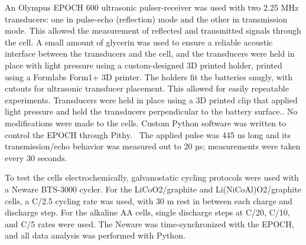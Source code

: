 An Olympus EPOCH 600 ultrasonic pulser-receiver was used with two 2.25 MHz transducers: one in pulse-echo (reflection) mode and the other in transmission mode. This allowed the measurement of reflected and transmitted signals through the cell. A small amount of glycerin was used to ensure a reliable acoustic interface between the transducers and the cell, and the transducers were held in place with light pressure using a custom-designed 3D printed holder, printed using a Formlabs Form1+ 3D printer. The holders fit the batteries snugly, with cutouts for ultrasonic transducer placement. This allowed for easily repeatable experiments. Transducers were held in place using a 3D printed clip that applied light pressure and held the transducers perpendicular to the battery surface.. No modifications were made to the cells. Custom Python software was written to control the EPOCH through Pithy.~\cite{Steingart_undated-rr} The applied pulse was 445 ns long and its transmission/echo behavior was measured out to 20 µs; measurements were taken every 30 seconds.
	
To test the cells electrochemically, galvanostatic cycling protocols were used with a Neware BTS-3000 cycler. For the LiCoO2/graphite and Li(NiCoAl)O2/graphite cells, a C/2.5 cycling rate was used, with 30 m rest in between each charge and discharge step. For the alkaline AA cells, single discharge steps at C/20, C/10, and C/5 rates were used. The Neware was time-synchronized with the EPOCH, and all data analysis was performed with Python.